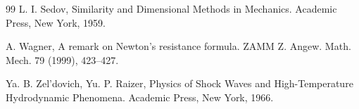 \documentclass[a4paper,12pt]{amsart}
\theoremstyle{plain}
\theoremstyle{definition}
\begin{document}
\begin{thebibliography}{99}
L. I. Sedov, Similarity and Dimensional Methods in Mechanics. Academic Press, New York, 1959.

    A. Wagner, A remark on Newton’s resistance formula. ZAMM Z. Angew. Math. Mech. 79  (1999), 423--427.


Ya. B. Zel'dovich, Yu. P. Raizer, Physics of Shock Waves and High-Temperature Hydrodynamic Phenomena. Academic Press, New York, 1966.



\end{thebibliography}
\end{document}
